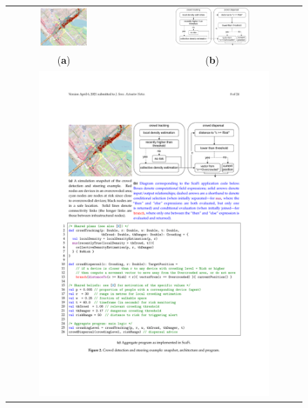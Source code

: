 \documentclass[jsan,article,accept,moreauthors,pdftex]{Definitions/mdpi}
\begin{document}
\begin{figure}[H]
\widefigure
\begin{tabular}{cc}

\includegraphics[width=0.43\textwidth]{imgs/crowd-example.png}
&
\includegraphics[width=0.43\textwidth]{imgs/crowd-detection-steering-diagram.pdf}\\

({\bf a})&({\bf b})\\


\multicolumn{2}{c}{\includegraphics[width=0.8\textwidth]{imgs/listing1.pdf}}\\




\end{tabular}
\end{figure}
\end{document}

